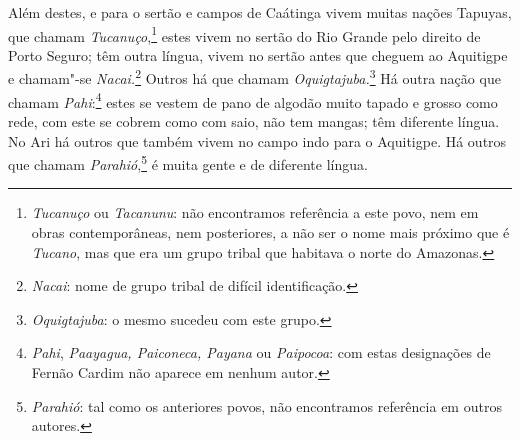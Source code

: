 \begin{linenumbers}
 Além destes, e para o sertão e campos de Caátinga vivem muitas nações
Tapuyas, que chamam \textit{Tucanuço},\footnote{ \textit{Tucanuço} ou
\textit{Tacanunu}: não encontramos referência a este povo, nem em
obras contemporâneas, nem posteriores, a não ser o nome mais próximo
que é \textit{Tucano}, mas que era um grupo tribal que habitava o norte
do Amazonas.} estes vivem no sertão do Rio Grande pelo direito
de Porto Seguro; têm outra língua, vivem no sertão antes que cheguem ao
Aquitigpe e chamam"-se \textit{Nacai.}\footnote{ \textit{Nacai}: 
nome de grupo tribal de difícil identificação.} Outros há que
chamam \textit{Oquigtajuba.}\footnote{ \textit{Oquigtajuba}: o mesmo
sucedeu com este grupo.} Há outra nação que chamam
\textit{Pahi}:\footnote{ \textit{Pahi}, \textit{Paayagua, Paiconeca,
Payana} ou \textit{Paipocoa}: com estas designações de Fernão Cardim
não aparece em nenhum autor.} estes se vestem de
pano de algodão muito tapado e grosso como rede, com este se cobrem
como com saio, não tem mangas; têm diferente língua. No Ari há outros
que também vivem no campo indo para o Aquitigpe. Há outros que chamam
\textit{Parahió},\footnote{ \textit{Parahió}: tal como os anteriores
povos, não encontramos referência em outros autores.} é muita
gente e de diferente língua. 


\end{linenumbers}
